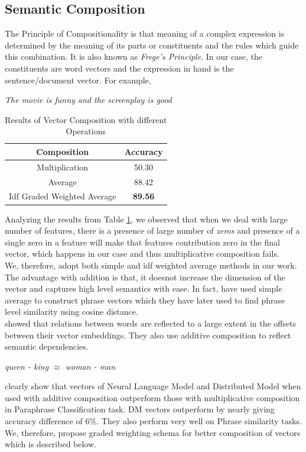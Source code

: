 \documentclass[11pt,a4paper]{article}
\begin{document}
\subsection{Semantic Composition}
\label{sec:composition}
The Principle of Compositionality is that meaning of a complex expression is determined by the meaning of its parts or constituents and the rules which guide this combination. It is also known as \emph{Frege's Principle}. In our case, the constituents are word vectors and the expression in hand is the sentence/document vector. For example,
\begin{center}
\emph{The movie is funny and the screenplay is good}
\end{center}

\begin {table}[H]
\centering
\begin{tabular}{ |c|c| }
\hline
Composition & Accuracy \\ \hline \hline
Multiplication & 50.30 \\ \hline
Average & 88.42 \\ \hline
Idf Graded Weighted Average & \textbf{89.56} \\ \hline
\end{tabular}
\caption {Results of Vector Composition with different Operations}
\label{table:composition}
\end{table}
Analyzing the results from Table \ref{table:composition}, we observed that when we deal with large number of features, there is a presence of large number of \emph{zeros} and presence of a single zero in a feature will make that features contribution zero in the final vector, which happens in our case and thus multiplicative composition fails.\\
We, therefore, adopt both simple and idf weighted average methods in our work. The advantage with addition is that, it doesnot increase the dimension of the vector and captures high level semantics with ease. In fact, \cite{Zou:13} have used simple average to construct phrase vectors which they have later used to find phrase level similarity using cosine distance.\\
\cite{Mikolov:13c} showed that relations between words are reflected to a large extent in the offsets between their vector embeddings. They also use additive composition to reflect semantic dependencies.
\begin{center}
\emph{queen - king $\approx$ woman - man}
\end{center}
\cite{Blacoe:12} clearly show that vectors of Neural Language Model and Distributed Model when used with additive composition outperform those with multiplicative composition in Paraphrase Classification task. DM vectors outperform by nearly giving accuracy difference of 6\%. They also perform very well on Phrase similarity tasks.\\
We, therefore, propose graded weighting schema for better composition of vectors which is described below.
\end{document}
